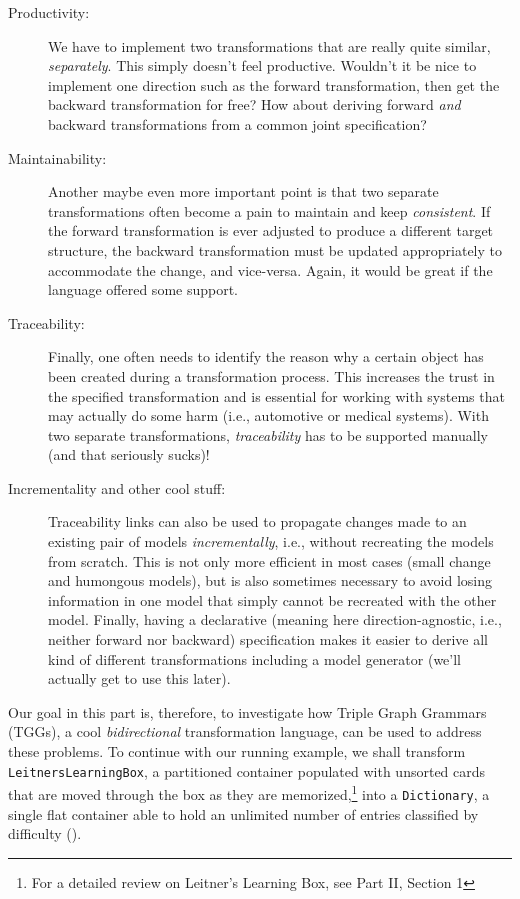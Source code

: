 \begin{description}
\item[Productivity:] We have to implement two transformations that are really quite similar, \emph{separately}. This simply doesn't feel productive.
Wouldn't it be nice to implement one direction such as the forward transformation, then get the backward transformation for free? How about deriving
forward \emph{and} backward transformations from a common joint specification?

\item[Maintainability:] Another maybe even more important point is that two separate transformations often become a pain to maintain and keep
\emph{consistent}. If the forward transformation is ever adjusted to produce a different target structure, the backward transformation must be updated
appropriately to accommodate the change, and vice-versa.  Again, it would be great if the language offered some support.

\item[Traceability:] Finally, one often needs to identify the reason why a certain object has been created during a transformation process. This increases the
trust in the specified transformation and is essential for working with systems that may actually do some harm (i.e., automotive or medical systems). With two
separate transformations, \emph{traceability} has to be supported manually (and that seriously sucks)! 

\item[Incrementality and other cool stuff:] Traceability links can also be used to propagate changes made to an existing pair of models \emph{incrementally}, i.e., without recreating the models from scratch. 
This is not only more efficient in most cases (small change and humongous models), but is also sometimes necessary to avoid losing information in one model that simply cannot be recreated with the other model.
Finally, having a declarative (meaning here direction-agnostic, i.e., neither forward nor backward) specification makes it easier to derive all kind of different transformations including a model generator (we'll actually get to use this later).
\end{description}

Our goal in this part is, therefore, to investigate how Triple Graph Grammars (TGGs), a cool \emph{bidirectional} transformation language, can be used to address these problems. 
To continue with our running example, we shall transform \texttt{Leit\-ners\-Learn\-ing\-Box}, a partitioned container populated with unsorted cards that are moved through the box as they are memorized,\footnote{For a detailed review on Leitner's Learning Box, see Part II, Section 1} into a \texttt{Dictionary}, a single flat container able to hold an unlimited number of entries classified by difficulty ().

